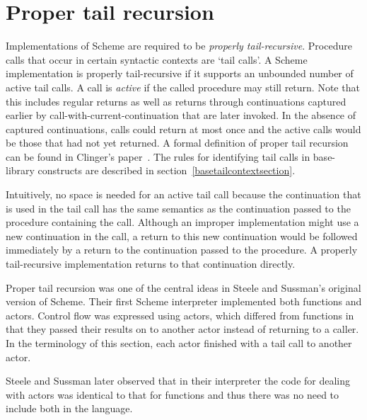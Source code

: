 \section{Proper tail recursion}
\label{proper tail recursion}

Implementations of Scheme are required to be
{\em properly tail-recursive}.
Procedure calls that occur in certain syntactic
contexts are `tail calls'.  A Scheme implementation is
properly tail-recursive if it supports an unbounded number of active
tail calls.  A call is {\em active} if the called procedure may still
return.  Note that this includes regular returns as well as returns
through continuations captured earlier by
{\cf call-with-current-continuation} that are later invoked.
In the absence of captured continuations, calls could
return at most once and the active calls would be those that had not
yet returned.
A formal definition of proper tail recursion can be found
in Clinger's paper~\cite{propertailrecursion}.  The rules for identifying tail calls
in base-library constructs are described in
section~\ref{basetailcontextsection}.

\begin{rationale}

Intuitively, no space is needed for an active tail call because the
continuation that is used in the tail call has the same semantics as the
continuation passed to the procedure containing the call.  Although an improper
implementation might use a new continuation in the call, a return
to this new continuation would be followed immediately by a return
to the continuation passed to the procedure.  A properly tail-recursive
implementation returns to that continuation directly.

Proper tail recursion was one of the central ideas in Steele and
Sussman's original version of Scheme.  Their first Scheme interpreter
implemented both functions and actors.  Control flow was expressed using
actors, which differed from functions in that they passed their results
on to another actor instead of returning to a caller.  In the terminology
of this section, each actor finished with a tail call to another actor.

Steele and Sussman later observed that in their interpreter the code
for dealing with actors was identical to that for functions and thus
there was no need to include both in the language.

\end{rationale}

